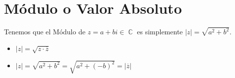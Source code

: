 \documentclass[12pt, fleqn]{report}                             %
\newcommand \Over {\overline}                                   %
\DeclareMathOperator \Complexs  {\mathbb{C}}                     %
\begin{document}
        \clearpage
        \section{Módulo o Valor Absoluto}
            Tenemos que el Módulo de $z = a+bi \in \Complexs$ es simplemente $|z| = \sqrt{a^2 + b^2}$.

            \begin{itemize}
                \item $|z| = \sqrt{z \cdot \overline{z}}$
                \item $|z| = \sqrt{a^2 + b^2} = \sqrt{a^2 + (-b)^2} = |\Over{z}|$
            \end{itemize}
\end{document}
